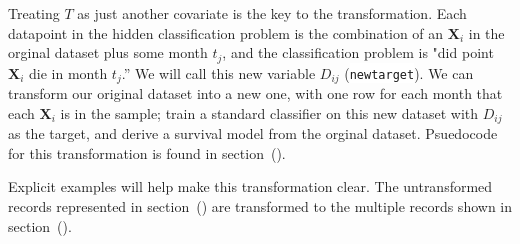 \documentclass[10pt,letterpaper]{article}
\newcommand{\codewhite}[1]{\colorbox{white}{\texttt{#1}}}
\begin{document}
Treating $T$ as just another covariate is the key to the transformation. Each datapoint in the hidden classification problem is the combination of an $\mathbf{X}_{i}$ in the orginal dataset plus some month $t_{j}$, and the classification problem is "did point $\mathbf{X}_{i}$ die in month $t_{j}$.'' We will call this new variable $D_{ij}$ (\codewhite{newtarget}).
We can transform our original dataset into a new one, with one row for each month that each $\mathbf{X}_{i}$ is in the sample; train a standard classifier on this new dataset with $D_{ij}$ as the target, and derive a survival model from the orginal dataset.
Psuedocode for this transformation is found in section~().

Explicit examples will help make this transformation clear.
The untransformed records represented in section~() are transformed to the multiple records shown in section~().




\end{document}
